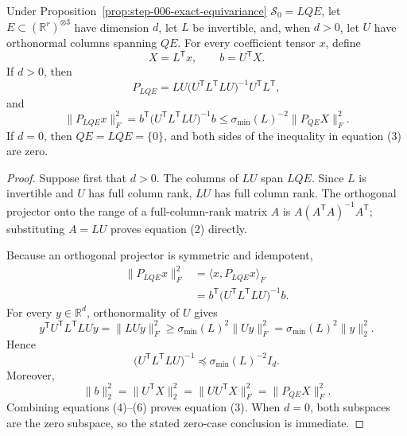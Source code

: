\begin{lemma}
\label{lem:step-008-oblique-projection}
Under Proposition~\ref{prop:step-006-exact-equivariance} \(\mathscr S_0=LQE\), let
\(E\subset(\mathbb R^r)^{\otimes3}\) have dimension \(d\), let \(L\) be
invertible, and, when \(d>0\), let \(U\) have orthonormal columns spanning
\(QE\). For every coefficient tensor \(x\), define
\[
  X=L^{\mathsf T}x,
  \qquad b=U^{\mathsf T}X.
\]
If \(d>0\), then
\[
  P_{LQE}
  =LU\bigl(U^{\mathsf T}L^{\mathsf T}LU\bigr)^{-1}
    U^{\mathsf T}L^{\mathsf T},                            \tag{2}
\]
and
\[
  \|P_{LQE}x\|_F^2
  =b^{\mathsf T}\bigl(U^{\mathsf T}L^{\mathsf T}LU\bigr)^{-1}b
  \le\sigma_{\min}(L)^{-2}\|P_{QE}X\|_F^2.              \tag{3}
\]
If \(d=0\), then \(QE=LQE=\{0\}\), and both sides of the inequality in
equation (3) are zero.

\end{lemma}

\begin{proof}
Suppose first that \(d>0\). The columns of
\(LU\) span \(LQE\). Since \(L\) is invertible and \(U\) has full column
rank, \(LU\) has full column rank. The orthogonal projector onto the range of
a full-column-rank matrix \(A\) is
\(A(A^{\mathsf T}A)^{-1}A^{\mathsf T}\); substituting \(A=LU\) proves
equation (2) directly.

Because an orthogonal projector is symmetric and idempotent,
\[
\begin{aligned}
  \|P_{LQE}x\|_F^2
  &=\langle x,P_{LQE}x\rangle_F\\
  &=b^{\mathsf T}\bigl(U^{\mathsf T}L^{\mathsf T}LU\bigr)^{-1}b.
\end{aligned}\tag{4}
\]
For every \(y\in\mathbb R^d\), orthonormality of \(U\) gives
\[
  y^{\mathsf T}U^{\mathsf T}L^{\mathsf T}LUy
  =\|LUy\|_F^2
  \ge\sigma_{\min}(L)^2\|Uy\|_F^2
  =\sigma_{\min}(L)^2\|y\|_2^2.
\]
Hence
\[
  \bigl(U^{\mathsf T}L^{\mathsf T}LU\bigr)^{-1}
  \preceq\sigma_{\min}(L)^{-2}I_d.                         \tag{5}
\]
Moreover,
\[
  \|b\|_2^2=\|U^{\mathsf T}X\|_2^2
  =\|UU^{\mathsf T}X\|_F^2
  =\|P_{QE}X\|_F^2.                                       \tag{6}
\]
Combining equations (4)--(6) proves equation (3). When \(d=0\), both
subspaces are the zero subspace, so the stated zero-case conclusion is
immediate. 

\end{proof}



